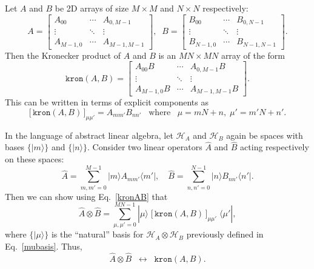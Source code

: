 \documentclass[pra,12pt]{revtex4}
\begin{document}
Let $A$ and $B$ be 2D arrays of size $M\times M$ and $N\times N$
respectively:
\begin{equation}
  A = \begin{bmatrix}A_{00} & \cdots & A_{0,M-1} \\ \vdots & \ddots & \vdots \\ A_{M-1,0} & \cdots & A_{M-1,M-1} \end{bmatrix}, \;\;
  B = \begin{bmatrix}B_{00} & \cdots & B_{0,N-1} \\ \vdots & \ddots & \vdots \\  B_{N-1,0} & \cdots & B_{N-1,N-1} \end{bmatrix}.
\end{equation}
Then the Kronecker product of $A$ and $B$ is an $MN\times MN$ array of
the form
\begin{equation}
  \texttt{kron}(A,B) = \begin{bmatrix} A_{00}B & \cdots & A_{0,M-1}B \\ \vdots & \ddots & \vdots \\ A_{M-1,0}B & \cdots & A_{M-1,M-1}B\end{bmatrix}.
    \label{kronAB_explicit}
\end{equation}
This can be written in terms of explicit components as
\begin{equation}
  \big[\,\texttt{kron}(A,B)\,\big]_{\mu\mu'} = A_{mm'} B_{nn'}\;\;\;\mathrm{where}\;\;\;\mu = mN+n, \; \mu' = m'N+n'.
  \label{kronAB}
\end{equation}

In the language of abstract linear algebra, let $\mathscr{H}_A$ and
$\mathscr{H}_B$ again be spaces with bases $\{|m\rangle\}$ and
$\{|n\rangle\}$.  Consider two linear operators $\hat{A}$ and
$\hat{B}$ acting respectively on these spaces:
\begin{equation}
  \hat{A} = \sum_{m,m'=0}^{M-1}  |m\rangle A_{mm'} \langle m'|, \quad \hat{B} = \sum_{n,n'=0}^{N-1} |n\rangle B_{nn'}\langle n'|.
\end{equation}
Then we can show using Eq.~\eqref{kronAB} that
\begin{equation}
  \hat{A}\otimes\hat{B} = \sum_{\mu,\mu'=0}^{MN-1} |\mu\rangle \; \big[\,\texttt{kron}(A,B)\,\big]_{\mu\mu'} \; \langle\mu'|,
\end{equation}
where $\big\{|\mu\rangle\big\}$ is the ``natural'' basis for
$\mathscr{H}_A\otimes\mathscr{H}_B$ previously defined in
Eq.~\eqref{mubasis}.  Thus,
\begin{equation}
  \hat{A}\otimes\hat{B} \;\;\leftrightarrow\;\;
  \texttt{kron}(A,B).
  \label{result2}
\end{equation}
\end{document}
